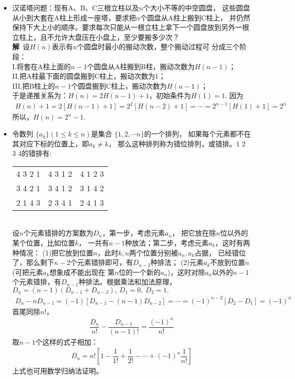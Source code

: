 \begin{itemize}[leftmargin=\inteval{\myitemleftmargin}pt,itemsep=
   \inteval{\myitemitempsep}pt,topsep=\inteval{\myitemtopsep}pt]
\item 汉诺塔问题：现有A、B、C三根立柱以及$ n $个大小不等的中空圆盘，
这些圆盘从小到大套在A柱上形成一座塔，要求把$ n $个圆盘从A柱上搬到C柱上，
并仍然保持下大上小的顺序。要求每次只能从一根立柱上拿下一个圆盘放到另外一根
立柱上，且不允许大盘压在小盘上，至少要搬多少次？\\
\textbf{解}\ 设$ H(n) $表示有$ n $个圆盘时最小的搬动次数，整个搬动过程可
分成三个阶段：\\
I.将套在A柱上面的$ n-1 $个圆盘从A柱搬到B柱，搬动次数为$ H(n-1) $；\\
II.把A柱最下面的圆盘搬到C柱上，搬动次数为1；\\
III.把B柱上的$ n-1 $个圆盘搬到C柱上，搬动次数为$ H(n-1) $；\\
于是递推关系为：$ H(n)=2H(n-1)+1 $，初始条件为$ H(1)=1 $. 因为
\begin{align*}
    H(n)+1=2[H(n-1)+1]=2^2[H(n-2)+1]=\cdots=2^{n-1}[H(1)+1]=2^n
\end{align*}
所以，$ H(n)=2^n-1 $. 

\item 令数列 $ \{ a_k \} (1\leq k \leq n) $是集合
$ \{ 1,2,\cdots n \} $的一个排列，
如果每个元素都不在其对应下标的位置上，即$ a_k\neq k $，
那么这种排列称为错位排列，或错排。1 2 3 4的错排有:
\begin{table}[h]
    \centering
    \begin{tabular}{ccc}
        4 3 2 1 & 4 3 1 2 & 4 1 2 3 \\
        3 4 2 1 & 3 4 1 2 & 3 1 4 2 \\
        2 1 4 3 & 2 3 4 1 & 2 4 1 3 
    \end{tabular}
\end{table} \\
设$ n $个元素错排的方案数为$ D_n $，第一步，考虑元素$ a_n $，
把它放在除$ n $位以外的某个位置，比如位置$ k $，
一共有$ n-1 $种放法；第二步，考虑元素$ a_k $，这时有两种情况：
(1)把它放到位置$ n $，此时$ k,n $两个位置分别被$ a_n,a_k $占据，
已经错位了，那么剩下$ n-2 $个元素错排即可，有$ D_{n-2} $种排法；
(2)元素$ a_k $不放到位置$ n $(可把元素$ a_k $想象成不能出现在
第$ n $位的一个新的$ a_n $)，这时对除$ a_n $以外的$ n-1 $
个元素错排，有$ D_{n-1} $种排法。根据乘法和加法原理，
$ D_n=(n-1)(D_{n-1}+D_{n-2}),\ D_1=0,\ D_2=1. $
\begin{gather*}
    D_n-nD_{n-1}=(-1)[D_{n-1}-(n-1)D_{n-2}]=\cdots =(-1)^{n-2}[D_2-D_1]=(-1)^n 
\end{gather*}
首尾同除$ n! $，
\begin{gather*}
    \dfrac{D_n}{n!}-\dfrac{D_{n-1}}{(n-1)!}=\dfrac{(-1)^n}{n!} 
\end{gather*}
取$ n-1 $个这样的式子相加：
\begin{align}\label{错排通项公式}
    D_n=n!\left[ 1-\dfrac{1}{1!}+\dfrac{1}{2!}-\cdots 
    +(-1)^n\dfrac{1}{n!}\right] 
\end{align}
上式也可用数学归纳法证明。


\end{itemize}
